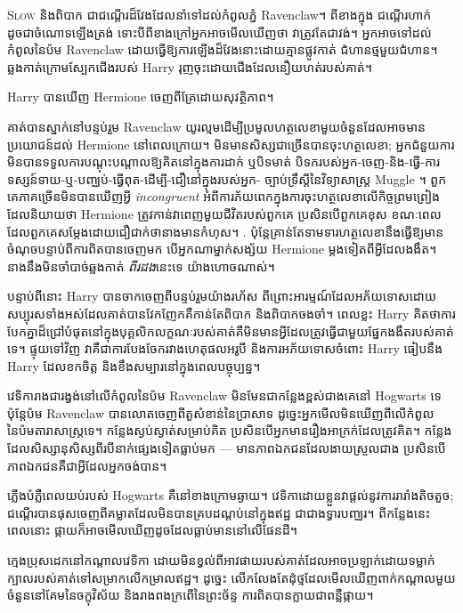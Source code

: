 
\lettrine{S}{low} និងពិបាក ជាជណ្តើរដ៏វែងដែលនាំទៅដល់កំពូលភ្នំ Ravenclaw។ ពីខាងក្នុង ជណ្តើរហាក់ដូចជាចំណោទឡើងត្រង់ ទោះបីពីខាងក្រៅអ្នកអាចមើលឃើញថា វាត្រូវតែជាវង់។ អ្នកអាចទៅដល់កំពូលនៃប៉ម Ravenclaw ដោយធ្វើឱ្យការឡើងដ៏វែងនោះដោយគ្មានផ្លូវកាត់ ជំហានថ្មមួយជំហាន។ ឆ្លងកាត់ក្រោមស្បែកជើងរបស់ Harry រុញចុះដោយជើងដែលនឿយហត់របស់គាត់។

Harry បានឃើញ Hermione ចេញពីគ្រែដោយសុវត្ថិភាព។

គាត់បានស្នាក់នៅបន្ទប់រួម Ravenclaw យូរល្មមដើម្បីប្រមូលហត្ថលេខាមួយចំនួនដែលអាចមានប្រយោជន៍ដល់ Hermione នៅពេលក្រោយ។ មិនមានសិស្សជាច្រើនបានចុះហត្ថលេខា; អ្នកជំនួយការមិនបានទទួលការបណ្តុះបណ្តាលឱ្យគិតនៅក្នុងការដាក់ ឬបិទមាត់ បិទករបស់អ្នក-ចេញ-និង-ធ្វើ-ការទស្សន៍ទាយ-ឬ-បញ្ឈប់-ធ្វើពុត-ដើម្បី-ជឿនៅក្នុងរបស់អ្នក- ច្បាប់ទ្រឹស្តីនៃវិទ្យាសាស្ត្រ Muggle ។ ពួកគេភាគច្រើនមិនបានឃើញអ្វី \emph{incongruent} អំពីការភ័យពេកក្នុងការចុះហត្ថលេខាលើកិច្ចព្រមព្រៀងដែលនិយាយថា Hermione ត្រូវកាន់វាពេញមួយជីវិតរបស់ពួកគេ ប្រសិនបើពួកគេខុស ខណៈពេលដែលពួកគេសម្តែងដោយជឿជាក់ថានាងមានកំហុស។ . ប៉ុន្តែ​គ្រាន់តែ​ទាមទារ​ហត្ថលេខា​នឹង​ធ្វើ​ឱ្យ​មាន​ចំណុច​បន្ទាប់​ពី​ការ​ពិត​បាន​ចេញ​មក បើ​អ្នក​ណា​ម្នាក់​សង្ស័យ Hermione ម្ដង​ទៀត​ពី​អ្វី​ដែល​ងងឹត។ នាងនឹងមិនចាំបាច់ឆ្លងកាត់ \emph{ពីរដង}នេះទេ យ៉ាងហោចណាស់។

បន្ទាប់ពីនោះ Harry បានចាកចេញពីបន្ទប់រួមយ៉ាងរហ័ស ពីព្រោះអារម្មណ៍ដែលអភ័យទោសដោយសប្បុរសទាំងអស់ដែលគាត់បានវែកញែកគឺកាន់តែពិបាក និងពិបាកចងចាំ។ ពេលខ្លះ Harry គិតថាការបែកគ្នាដ៏ជ្រៅបំផុតនៅក្នុងបុគ្គលិកលក្ខណៈរបស់គាត់គឺមិនមានអ្វីដែលត្រូវធ្វើជាមួយផ្នែកងងឹតរបស់គាត់ទេ។ ផ្ទុយទៅវិញ វាគឺជាការបែងចែករវាងហេតុផលអរូបី និងការអភ័យទោសចំពោះ Harry ធៀបនឹង Harry ដែលខកចិត្ត និងខឹងសម្បារនៅក្នុងពេលបច្ចុប្បន្ន។

វេទិការាងជារង្វង់នៅលើកំពូលនៃប៉ម Ravenclaw មិនមែនជាកន្លែងខ្ពស់ជាងគេនៅ Hogwarts ទេ ប៉ុន្តែប៉ម Ravenclaw បានលោតចេញពីតួសំខាន់នៃប្រាសាទ ដូច្នេះអ្នកមើលមិនឃើញពីលើកំពូលនៃប៉មតារាសាស្ត្រទេ។ កន្លែងស្ងប់ស្ងាត់សម្រាប់គិត ប្រសិនបើអ្នកមានរឿងអាក្រក់ដែលត្រូវគិត។ កន្លែងដែលសិស្សានុសិស្សពីរបីនាក់ផ្សេងទៀតធ្លាប់មក — មានភាពឯកជនដែលងាយស្រួលជាង ប្រសិនបើភាពឯកជនគឺជាអ្វីដែលអ្នកចង់បាន។

ភ្លើងបំភ្លឺពេលយប់របស់ Hogwarts គឺនៅខាងក្រោមឆ្ងាយ។ វេទិកាដោយខ្លួនវាផ្តល់នូវការរារាំងតិចតួច; ជណ្ដើរ​បាន​ផុស​ចេញ​ពី​គម្លាត​ដែល​មិន​បាន​គ្រប​ដណ្តប់​នៅ​ក្នុង​ឥដ្ឋ ជា​ជាង​ទ្វារ​បញ្ឈរ។ ពីកន្លែងនេះ ពេលនោះ ផ្កាយក៏អាចមើលឃើញដូចដែលធ្លាប់មាននៅលើផែនដី។

ក្មេងប្រុសដេកនៅកណ្តាលវេទិកា ដោយមិនខ្វល់ពីអាវផាយរបស់គាត់ដែលអាចប្រឡាក់ដោយទម្លាក់ក្បាលរបស់គាត់ទៅសម្រាកលើកម្រាលឥដ្ឋ។ ដូច្នេះ លើកលែងតែដុំថ្មដែលមើលឃើញពាក់កណ្តាលមួយចំនួននៅគែមនៃចក្ខុវិស័យ និងរាងពងក្រពើនៃព្រះច័ន្ទ ការពិតបានក្លាយជាពន្លឺផ្កាយ។

